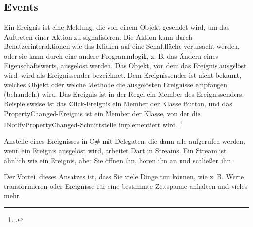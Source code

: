 \subsection{Events}
Ein Ereignis ist eine Meldung, die von einem Objekt gesendet wird, um das Auftreten einer Aktion zu signalisieren. Die Aktion kann durch Benutzerinteraktionen wie das Klicken auf eine Schaltfläche verursacht werden, oder sie kann durch eine andere Programmlogik, z. B. das Ändern eines Eigenschaftswerts, ausgelöst werden. Das Objekt, von dem das Ereignis ausgelöst wird, wird als Ereignissender bezeichnet. Dem Ereignissender ist nicht bekannt, welches Objekt oder welche Methode die ausgelösten Ereignisse empfangen (behandeln) wird. Das Ereignis ist in der Regel ein Member des Ereignissenders. Beispielsweise ist das Click-Ereignis ein Member der Klasse Button, und das PropertyChanged-Ereignis ist ein Member der Klasse, von der die INotifyPropertyChanged-Schnittstelle implementiert wird. \footcite[Vgl. MICROSFT Events][Abgerufen am \today]{GoogleFlutterSharedPreferences2020} 

Anstelle eines Ereignisses in C\# mit Delegaten, die dann alle aufgerufen werden, wenn ein Ereignis ausgelöst wird, arbeitet Dart in Streams. Ein Stream ist ähnlich wie ein Ereignis, aber Sie öffnen ihn, hören ihn an und schließen ihn.

Der Vorteil dieses Ansatzes ist, dass Sie viele Dinge tun können, wie z. B. Werte transformieren oder Ereignisse für eine bestimmte Zeitspanne anhalten und vieles mehr. 

\begin{minipage}{\linewidth}

\end{minipage}



